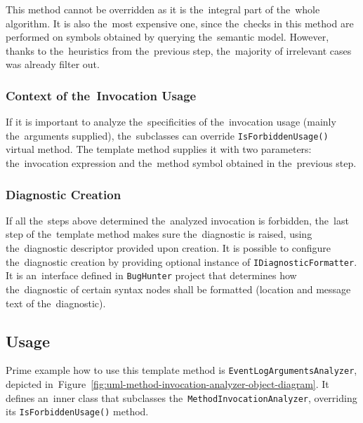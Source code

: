 \documentclass[
  digital, %
  table,   %
  lof,     %
  lot,     %
  oneside,
]{fithesis3}
\begin{document}
This method cannot be overridden as it is the~integral part of the~whole algorithm. It is also the~most expensive one, since the~checks in this method are performed on symbols obtained by querying the~semantic model. However, thanks to the~heuristics from the~previous step, the~majority of irrelevant cases was already filter out.

\subsubsection{Context of the~Invocation Usage}
If it is important to analyze the~specificities of the~invocation usage (mainly the~arguments supplied), the~subclasses can override \texttt{IsForbiddenUsage()} virtual method. The template method supplies it with two parameters: the~invocation expression and the~method symbol obtained in the~previous step.

\subsubsection{Diagnostic Creation}
If all the~steps above determined the~analyzed invocation is forbidden, the~last step of the~template method makes sure the~diagnostic is raised, using the~diagnostic descriptor provided upon creation. It is possible to configure the~diagnostic creation by providing optional instance of \texttt{IDiagnosticFormatter}. It is an~interface defined in \texttt{BugHunter} project that determines how the~diagnostic of certain syntax nodes shall be formatted (location and message text of the~diagnostic).

\subsection{Usage}
\label{sec:method-invocation-analyzer-usage}
Prime example how to use this template method is \texttt{EventLogArgumentsAnalyzer}, depicted in~Figure~\ref{fig:uml-method-invocation-analyzer-object-diagram}. It defines an~inner class that subclasses the~\texttt{MethodInvocationAnalyzer}, overriding its \texttt{IsForbiddenUsage()} method.
\end{document}
